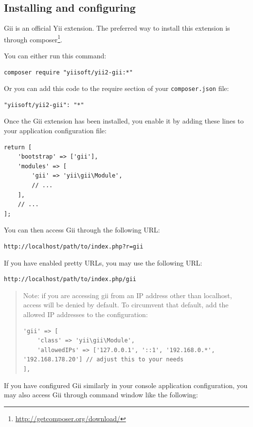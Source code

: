 \subsection{Installing and configuring}
Gii is an official Yii extension. The preferred way to install this extension is through
composer\footnote{\url{http://getcomposer.org/download/}}.

You can either run this command:

\begin{lstlisting}
composer require "yiisoft/yii2-gii:*"
\end{lstlisting}
Or you can add this code to the require section of your \lstinline|composer.json| file:

\begin{lstlisting}
"yiisoft/yii2-gii": "*"
\end{lstlisting}
Once the Gii extension has been installed, you enable it by adding these lines to your application configuration file:

\lstset{language=php}\begin{lstlisting}
return [
    'bootstrap' => ['gii'],
    'modules' => [
        'gii' => 'yii\gii\Module',
        // ...
    ],
    // ...
];
\end{lstlisting}
You can then access Gii through the following URL:

\begin{lstlisting}
http://localhost/path/to/index.php?r=gii
\end{lstlisting}
If you have enabled pretty URLs, you may use the following URL:

\begin{lstlisting}
http://localhost/path/to/index.php/gii
\end{lstlisting}
\begin{quote}Note: if you are accessing gii from an IP address other than localhost, access will be denied by default.
To circumvent that default, add the allowed IP addresses to the configuration:

\lstset{language=php}\begin{lstlisting}
'gii' => [
    'class' => 'yii\gii\Module',
    'allowedIPs' => ['127.0.0.1', '::1', '192.168.0.*', '192.168.178.20'] // adjust this to your needs
],
\end{lstlisting}
\end{quote}
If you have configured Gii similarly in your console application configuration, you may also access Gii through
command window like the following:

